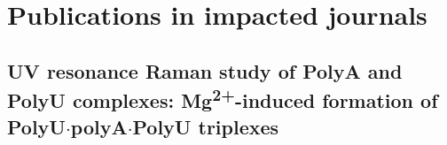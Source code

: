 \chapter{Publications in impacted journals}

\section[\texorpdfstring{%
    UV resonance Raman study of PolyA and PolyU complexes:\\
		Mg\textsuperscript{2+}\babelhyphen{nobreak}induced formation of
		PolyU$\cdot$polyA$\cdot$PolyU triplexes
}{%
    UV resonance Raman study of PolyA and PolyU complexes:
		Mg\texttwosuperior\textplussuperior-induced formation of PolyU·polyA·PolyU
		triplexes
}]{%
    UV resonance Raman study of PolyA and PolyU complexes:
		Mg\textsuperscript{2+}-induced formation of PolyU$\cdot$polyA$\cdot$PolyU
		triplexes
}%
